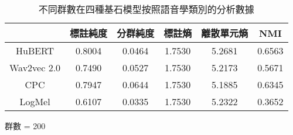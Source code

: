 \begin{table}[!htbp]
    \begin{subtable}[t]{\textwidth}
        \centering
        \begin{tabular}{|c|c|c|c|c|c|} \hline
                        & 標註純度   & 分群純度   & 標註熵    & 離散單元熵  & NMI    \\ \hline
            HuBERT      &     0.8004 &     0.0464 &    1.7530 &      5.2681 & 0.6563 \\ \hline    %
            Wav2vec 2.0 &     0.7490 &     0.0527 &    1.7530 &      5.2173 & 0.5671 \\ \hline    %
            CPC         &     0.7947 &     0.0644 &    1.7530 &      5.1885 & 0.6345 \\ \hline    %
            LogMel      &     0.6107 &     0.0335 &    1.7530 &      5.2322 & 0.3652 \\ \hline    %
        \end{tabular}
        \caption{群數 = 200}
        \label{tab:ch3-clu200-pcls}
    \end{subtable}

    \caption{不同群數在四種基石模型按照語音學類別的分析數據}
    \label{tab:single-cluster-phonetype-results}
\end{table}
